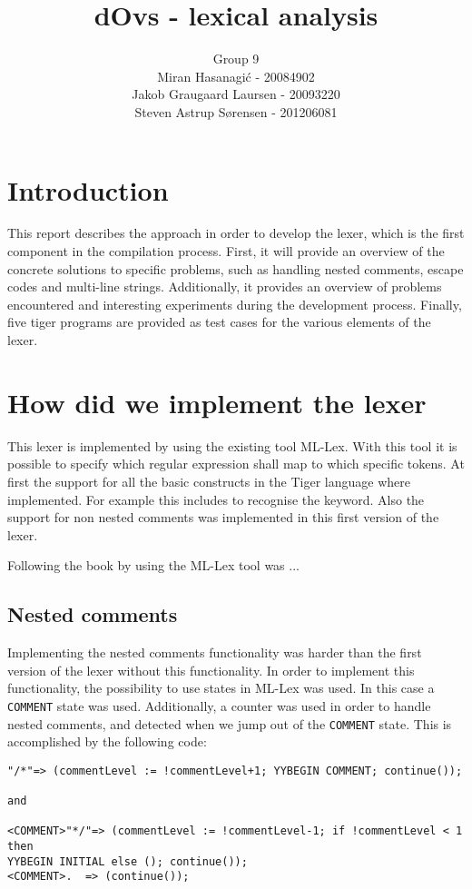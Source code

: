 \documentclass{article}
\title{dOvs - lexical analysis}
\author{
  Group 9 \\
  Miran Hasanagi\'{c} - 20084902 \\
  Jakob Graugaard Laursen - 20093220\\
  Steven Astrup S\o rensen - 201206081
}
\begin{document}
\maketitle

\section{Introduction}
This report describes the approach in order to develop the lexer, which is the first component in the compilation process. 
First, it will provide an overview of the concrete solutions to specific problems, such as handling nested comments, escape codes and multi-line strings. 
Additionally, it provides an overview of problems encountered and interesting experiments during the development process. Finally, five tiger programs are provided as test cases for the various elements of the lexer. 

\section{How did we implement the lexer}
This lexer is implemented by using the existing tool ML-Lex. With this tool it is possible to specify which regular expression shall map to which specific tokens. At first the support for all the basic constructs in the Tiger language where implemented. For example this includes to recognise the keyword. Also the support for non nested comments was implemented in this first version of the lexer. 

Following the book by using the ML-Lex tool was ...

\subsection{Nested comments}
Implementing the nested comments functionality was harder than the first version of the lexer without this functionality. In order to implement this functionality, the possibility to use states in ML-Lex was used. In this case a \texttt{COMMENT} state was used. Additionally, a counter was used in order to handle nested comments, and detected when we jump out of the \texttt{COMMENT} state. This is accomplished by the following code:

\begin{lstlisting}[frame=single]
"/*"=> (commentLevel := !commentLevel+1; YYBEGIN COMMENT; continue());

and

<COMMENT>"*/"=> (commentLevel := !commentLevel-1; if !commentLevel < 1 then 
YYBEGIN INITIAL else (); continue());
<COMMENT>.	=> (continue());
\end{lstlisting}
\end{document}

